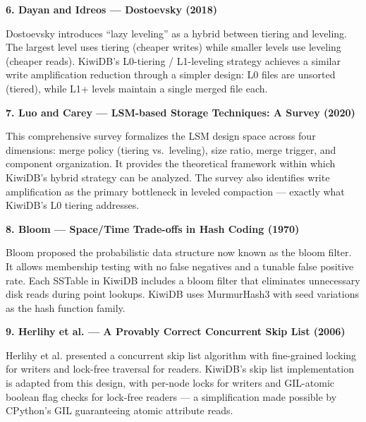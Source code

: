 \documentclass[oneside,a4paper,12pt]{book}
\begin{document}
\vspace{1\baselineskip}

\textbf{6. Dayan and Idreos --- Dostoevsky (2018) \cite{c11}}

Dostoevsky introduces ``lazy leveling'' as a hybrid between tiering and leveling. The largest level uses tiering (cheaper writes) while smaller levels use leveling (cheaper reads). KiwiDB's L0-tiering / L1-leveling strategy achieves a similar write amplification reduction through a simpler design: L0 files are unsorted (tiered), while L1+ levels maintain a single merged file each.

\vspace{1\baselineskip}

\textbf{7. Luo and Carey --- LSM-based Storage Techniques: A Survey (2020) \cite{c12}}

This comprehensive survey formalizes the LSM design space across four dimensions: merge policy (tiering vs.\ leveling), size ratio, merge trigger, and component organization. It provides the theoretical framework within which KiwiDB's hybrid strategy can be analyzed. The survey also identifies write amplification as the primary bottleneck in leveled compaction --- exactly what KiwiDB's L0 tiering addresses.

\vspace{1\baselineskip}

\textbf{8. Bloom --- Space/Time Trade-offs in Hash Coding (1970) \cite{c13}}

Bloom proposed the probabilistic data structure now known as the bloom filter. It allows membership testing with no false negatives and a tunable false positive rate. Each SSTable in KiwiDB includes a bloom filter that eliminates unnecessary disk reads during point lookups. KiwiDB uses MurmurHash3 with seed variations as the hash function family.

\vspace{1\baselineskip}

\textbf{9. Herlihy et al. --- A Provably Correct Concurrent Skip List (2006) \cite{c14}}

Herlihy et al. presented a concurrent skip list algorithm with fine-grained locking for writers and lock-free traversal for readers. KiwiDB's skip list implementation is adapted from this design, with per-node locks for writers and GIL-atomic boolean flag checks for lock-free readers --- a simplification made possible by CPython's GIL guaranteeing atomic attribute reads.

\vspace{1\baselineskip}
\end{document}
